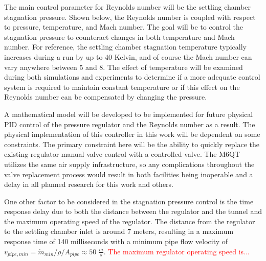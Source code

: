 The main control parameter for Reynolds number will be the settling chamber stagnation pressure. Shown below, the Reynolds number is coupled with respect to pressure, temperature, and Mach number. The goal will be to control the stagnation pressure to counteract changes in both temperature and Mach number. For reference, the settling chamber stagnation temperature typically increases during a run by up to 40 Kelvin, and of course the Mach number can vary anywhere between 5 and 8. The effect of temperature will be examined during both simulations and experiments to determine if a more adequate control system is required to maintain constant temperature or if this effect on the Reynolds number can be compensated by changing the pressure.

A mathematical model will be developed to be implemented for future physical PID control of the pressure regulator and the Reynolds number as a result. The physical implementation of this controller in this work will be dependent on some constraints. The primary constraint here will be the ability to quickly replace the existing regulator manual valve control with a controlled valve. The M6QT utilizes the same air supply infrastructure, so any complications throughout the valve replacement process would result in both facilities being inoperable and a delay in all planned research for this work and others.

One other factor to be considered in the stagnation pressure control is the time response delay due to both the distance between the regulator and the tunnel and the maximum operating speed of the regulator. The distance from the regulator to the settling chamber inlet is around 7 meters, resulting in a maximum response time of 140 milliseconds with a minimum pipe flow velocity of $v_{pipe,min} = \dot{m}_{min}/\rho/A_{pipe} \approx 50 \; \frac{m}{s}$. \textcolor{red}{The maximum regulator operating speed is...}

